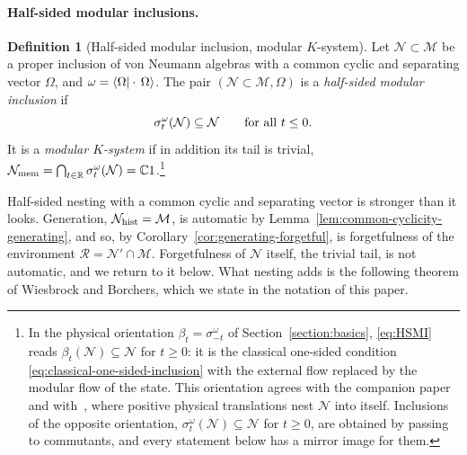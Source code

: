 \documentclass[a4paper,11pt]{article}
\theoremstyle{definition}
\newtheorem{definition}{Definition}[section]
\begin{document}
\paragraph{Half-sided modular inclusions.}
\begin{definition}[Half-sided modular inclusion, modular $K$-system]\label{def:modular-K}\label{def:HSMI}
Let $\mathcal N\subset\mathcal M$ be a proper inclusion of von Neumann algebras with a common cyclic and separating vector $\Omega$, and $\omega=\braket{\Omega|\cdot\,\Omega}$. The pair $(\mathcal N\subset\mathcal M,\Omega)$ is a \emph{half-sided modular inclusion} if
\begin{equation}
 \sigma^{\omega}_t(\mathcal N)\subseteq\mathcal N\qquad\hbox{for all } t\le0 .
 \label{eq:HSMI}
\end{equation}
It is a \emph{modular $K$-system} if in addition its tail is trivial, $\mathcal N_{\rm mem}=\bigcap_{t\in\mathbb R}\sigma^\omega_t(\mathcal N)=\mathbb C1$.\footnote{In the physical orientation $\beta_t=\sigma^\omega_{-t}$ of Section~\ref{section:basics}, \eqref{eq:HSMI} reads $\beta_t(\mathcal N)\subseteq\mathcal N$ for $t\ge0$: it is the classical one-sided condition \eqref{eq:classical-one-sided-inclusion} with the external flow replaced by the modular flow of the state. This orientation agrees with the companion paper and with~\cite{Wiesbrock1993,revolutionizing}, where positive physical translations nest $\mathcal N$ into itself. Inclusions of the opposite orientation, $\sigma^\omega_t(\mathcal N)\subseteq\mathcal N$ for $t\ge0$, are obtained by passing to commutants, and every statement below has a mirror image for them.}
\end{definition}

Half-sided nesting with a common cyclic and separating vector is stronger than it looks. Generation, $\mathcal N_{\rm hist}=\mathcal M$, is automatic by Lemma~\ref{lem:common-cyclicity-generating}, and so, by Corollary~\ref{cor:generating-forgetful}, is forgetfulness of the environment $\mathcal R=\mathcal N'\cap\mathcal M$. Forgetfulness of $\mathcal N$ itself, the trivial tail, is not automatic, and we return to it below. What nesting adds is the following theorem of Wiesbrock and Borchers, which we state in the notation of this paper.
\end{document}
